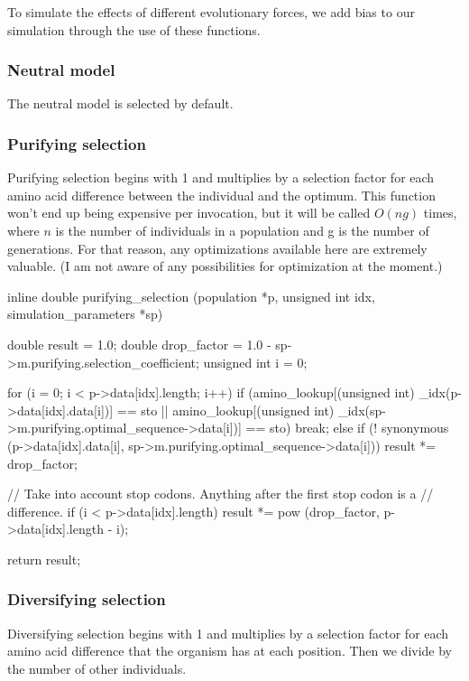 \documentclass{article}
\begin{document}
      To simulate the effects of different evolutionary forces, we add bias to
      our simulation through the use of these functions.

      \subsubsection{Neutral model}

	The neutral model is selected by default.

      \subsubsection{Purifying selection}

	Purifying selection begins with 1 and multiplies by a selection factor
	for each amino acid difference between the individual and the optimum.
	This function won't end up being expensive per invocation, but it will
	be called $O(ng)$ times, where $n$ is the number of individuals in a
	population and g is the number of generations. For that reason, any
	optimizations available here are extremely valuable. (I am not aware of
	    any possibilities for optimization at the moment.)

\begin{ccode}
inline double purifying_selection (population *p, unsigned int idx, simulation_parameters *sp) {
  double	result          = 1.0;
  double	drop_factor     = 1.0 - sp->m.purifying.selection_coefficient;
  unsigned int	i            	= 0;

  for (i = 0; i < p->data[idx].length; i++)
    if (amino_lookup[(unsigned int) _idx(p->data[idx].data[i])] == sto ||
	amino_lookup[(unsigned int) _idx(sp->m.purifying.optimal_sequence->data[i])] == sto)
      break;
    else if (! synonymous (p->data[idx].data[i], sp->m.purifying.optimal_sequence->data[i]))
      result *= drop_factor;

  // Take into account stop codons. Anything after the first stop codon is a
  // difference.
  if (i < p->data[idx].length)
    result *= pow (drop_factor, p->data[idx].length - i);

  return result;
}
\end{ccode}

      \subsubsection{Diversifying selection}

	Diversifying selection begins with 1 and multiplies by a selection
	factor for each amino acid difference that the organism has at each
	position. Then we divide by the number of other individuals.
\end{document}

